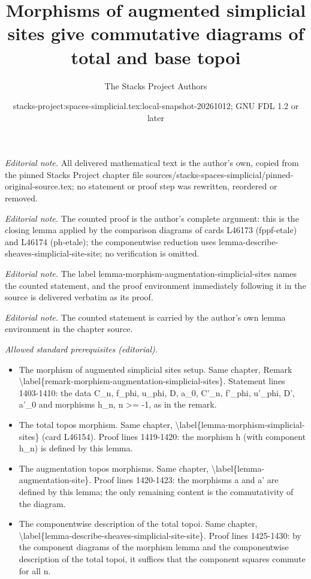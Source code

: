 \documentclass{stacks-project}
\title{Morphisms of augmented simplicial sites give commutative diagrams of total and base topoi}
\author{The Stacks Project Authors}
\date{stacks-project:spaces-simplicial.tex:local-snapshot-20261012; GNU FDL 1.2 or later}
\theoremstyle{plain}
\theoremstyle{definition}
\theoremstyle{remark}
\numberwithin{equation}{subsection}
\begin{document}
\maketitle
\noindent\textit{Editorial note.} All delivered mathematical text is the author's own, copied from the pinned Stacks Project chapter file sources/stacks-spaces-simplicial/pinned-original-source.tex; no statement or proof step was rewritten, reordered or removed.\par\medskip
\noindent\textit{Editorial note.} The counted proof is the author's complete argument: this is the closing lemma applied by the comparison diagrams of cards L46173 (fppf-etale) and L46174 (ph-etale); the componentwise reduction uses lemma-describe-sheaves-simplicial-site-site; no verification is omitted.\par\medskip
\noindent\textit{Editorial note.} The label lemma-morphism-augmentation-simplicial-sites names the counted statement, and the proof environment immediately following it in the source is delivered verbatim as its proof.\par\medskip
\noindent\textit{Editorial note.} The counted statement is carried by the author's own lemma environment in the chapter source.\par\medskip
\noindent\textit{Allowed standard prerequisites (editorial).}\begin{itemize}
\item The morphism of augmented simplicial sites setup. Same chapter, Remark \textbackslash{}label\{remark-morphism-augmentation-simplicial-sites\}. Statement lines 1403-1410: the data C\_n, f\_phi, u\_phi, D, a\_0, C'\_n, f'\_phi, u'\_phi, D', a'\_0 and morphisms h\_n, n >= -1, as in the remark.
\item The total topos morphism. Same chapter, \textbackslash{}label\{lemma-morphism-simplicial-sites\} (card L46154). Proof lines 1419-1420: the morphism h (with component h\_n) is defined by this lemma.
\item The augmentation topos morphisms. Same chapter, \textbackslash{}label\{lemma-augmentation-site\}. Proof lines 1420-1423: the morphisms a and a' are defined by this lemma; the only remaining content is the commutativity of the diagram.
\item The componentwise description of the total topoi. Same chapter, \textbackslash{}label\{lemma-describe-sheaves-simplicial-site-site\}. Proof lines 1425-1430: by the component diagrams of the morphism lemma and the componentwise description of the total topoi, it suffices that the component squares commute for all n.
\end{itemize}\medskip
\end{document}
